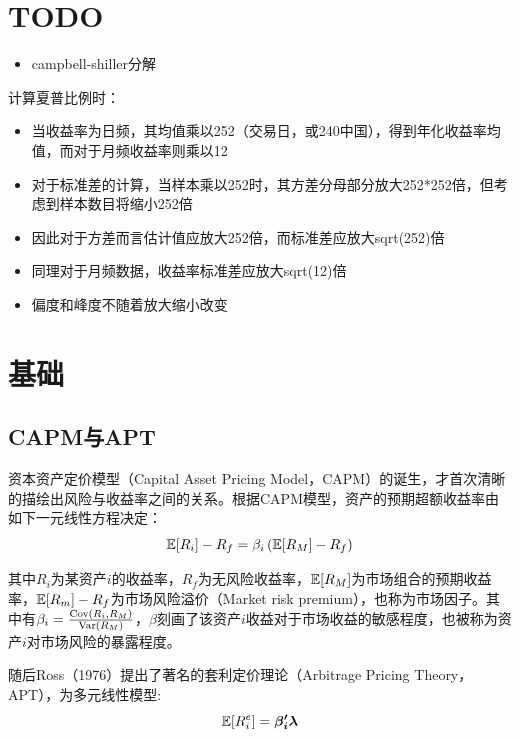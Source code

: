 \documentclass[11pt]{article}
\begin{document}
\maketitle
\tableofcontents

\section{TODO}
\begin{itemize}
    \item campbell-shiller分解
\end{itemize}

计算夏普比例时：
\begin{itemize}
    \item 当收益率为日频，其均值乘以252（交易日，或240中国），得到年化收益率均值，而对于月频收益率则乘以12
    \item 对于标准差的计算，当样本乘以252时，其方差分母部分放大252*252倍，但考虑到样本数目将缩小252倍
    \item 因此对于方差而言估计值应放大252倍，而标准差应放大sqrt(252)倍
    \item 同理对于月频数据，收益率标准差应放大sqrt(12)倍
    \item 偏度和峰度不随着放大缩小改变
\end{itemize}


\section{基础}

\subsection{CAPM与APT}

资本资产定价模型（Capital Asset Pricing Model，CAPM）的诞生，才首次清晰的描绘出风险与收益率之间的关系。根据CAPM模型，资产的预期超额收益率由如下一元线性方程决定：
\begin{equation*}
    \mathbb{E}[R_i] - R_f = \beta_i \left( \mathbb{E}[R_M]-R_f \right)
\end{equation*}

其中$R_i$为某资产$i$的收益率，$R_f$为无风险收益率，$\mathbb{E}[R_M]$为市场组合的预期收益率，$\mathbb{E}[R_m]- R_f$为市场风险溢价（Market risk premium），也称为市场因子。其中有$\beta_i = \frac{\operatorname{Cov}(R_i,R_M)}{\operatorname{Var}(R_M)}$，$\beta$刻画了该资产$i$收益对于市场收益的敏感程度，也被称为资产$i$对市场风险的暴露程度。

随后Ross（1976）提出了著名的套利定价理论（Arbitrage Pricing Theory，APT），为多元线性模型:
\begin{equation*}
    \mathbb{E}[R_i^e] = \bm{\beta_{i}' \lambda}
\end{equation*}
\end{document}

